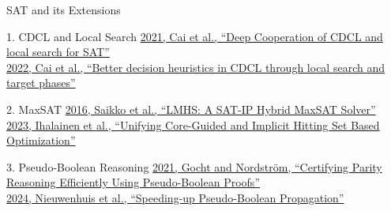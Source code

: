 \documentclass[de]{sdqbeamer}
\begin{document}
\begin{frame}{SAT and its Extensions}
	\begin{exampleblock}{1. CDCL and Local Search}
		\href{https://doi.org/10.1007/978-3-030-80223-3\_6}{2021, Cai et al., “Deep Cooperation of CDCL and local search for SAT”}\\
		\href{https://doi.org/10.1613/jair.1.13666}{2022, Cai et al., “Better decision heuristics in CDCL through local search and target phases”}\\
	\end{exampleblock}
	\begin{exampleblock}{2. MaxSAT}
		\href{https://doi.org/10.1007/978-3-319-40970-2\_34}{2016, Saikko et al., “LMHS: A SAT-IP Hybrid MaxSAT Solver”}\\
		\href{https://doi.org/10.24963/ijcai.2023/215}{2023, Ihalainen et al., “Unifying Core-Guided and Implicit Hitting Set Based Optimization”}
	\end{exampleblock}
	\begin{exampleblock}{3. Pseudo-Boolean Reasoning}
		\href{https://doi.org/10.1609/aaai.v35i5.16494}{2021, Gocht and Nordström, “Certifying Parity Reasoning Efficiently Using Pseudo-Boolean Proofs”}\\
		\href{https://doi.org/10.4230/LIPIcs.SAT.2024.22}{2024, Nieuwenhuis et al., “Speeding-up Pseudo-Boolean Propagation”}
	\end{exampleblock}
\end{frame}

\end{document}
